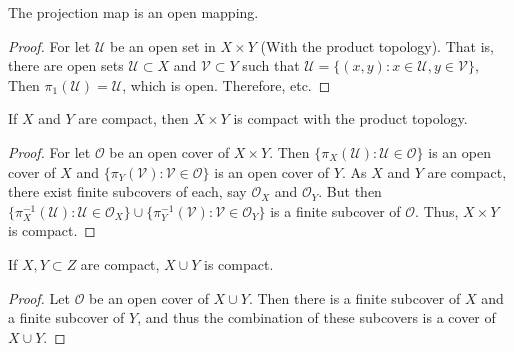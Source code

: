         \begin{theorem}
        The projection map is an open mapping.
        \end{theorem}
        \begin{proof}
        For let $\mathscr{U}$ be an open set in $X\times Y$ (With the product topology). That is, there are open sets $\mathcal{U}\subset X$ and $\mathcal{V}\subset Y$ such that $\mathscr{U}= \{(x,y):x\in \mathcal{U},y\in \mathcal{V}\}$, Then $\pi_1(\mathscr{U}) =\mathcal{U}$, which is open. Therefore, etc.
        \end{proof}
        \begin{theorem}
        If $X$ and $Y$ are compact, then $X\times Y$ is compact with the product topology.
        \end{theorem}
        \begin{proof}
        For let $\mathscr{O}$ be an open cover of $X\times Y$. Then $\{\pi_X(\mathscr{U}):\mathscr{U}\in \mathscr{O}\}$ is an open cover of $X$ and $\{\pi_{Y}(\mathscr{V}):\mathscr{V}\in \mathscr{O}\}$ is an open cover of $Y$. As $X$ and $Y$ are compact, there exist finite subcovers of each, say $\mathcal{O}_X$ and $\mathcal{O}_Y$. But then $\{\pi_{X}^{-1}(\mathcal{U}):\mathcal{U}\in \mathcal{O}_X\}\cup \{\pi_{Y}^{-1}(\mathcal{V}):\mathcal{V}\in \mathcal{O}_Y\}$ is a finite subcover of $\mathscr{O}$. Thus, $X\times Y$ is compact.
        \end{proof}
        \begin{theorem}
        If $X,Y\subset Z$ are compact, $X\cup Y$ is compact.
        \end{theorem}
        \begin{proof}
        Let $\mathcal{O}$ be an open cover of $X\cup Y$. Then there is a finite subcover of $X$ and a finite subcover of $Y$, and thus the combination of these subcovers is a cover of $X\cup Y$.
        \end{proof}
